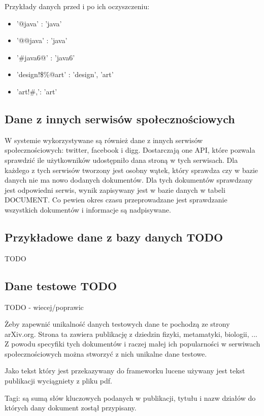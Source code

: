 Przykłady danych przed i po ich oczyszczeniu:

\begin{itemize} 
    \item '@java' : 'java'
    \item '@@java' : 'java'
    \item  '\#java6@' : 'java6'
    \item  'design!\$\%@art' : 'design', 'art'
    \item  'art!\#,': 'art'
\end{itemize}

\subsection*{Dane z innych serwisów społecznościowych}

W systemie wykorzystywane są również dane z innych serwisów społecznościowych: twitter, facebook i digg. Dostarczają one API, które pozwala sprawdzić ile użytkowników udostępniło dana stroną w tych serwisach. Dla każdego z tych serwisów tworzony jest osobny wątek, który sprawdza czy w bazie danych nie ma nowo dodanych dokumentów. Dla tych dokumentów sprawdzany jest odpowiedni serwis, wynik zapisywany jest w bazie danych w tabeli DOCUMENT. Co pewien okres czasu przeprowadzane jest sprawdzanie wszystkich dokumentów i informacje są nadpisywane. 


\subsection*{Przykładowe dane z bazy danych TODO}

TODO

\subsection{Dane testowe TODO}

TODO - wiecej/poprawic

Żeby zapewnić unikalność danych testowych dane te pochodzą ze strony arXiv.org. Strona ta zawiera publikację z dziedzin fizyki, metamatyki, biologii, ... Z powodu specyfiki tych dokumentów i raczej małej ich popularności w serwiwach społecznościowych można stworzyć z nich unikalne dane testowe.

Jako tekst który jest przekazywany do frameworku lucene używany jest tekst publikacji wyciągniety z pliku pdf.

Tagi: są sumą słów kluczowych podanych w publikacji, tytułu i nazw działów do których dany dokument zostął przypisany.

